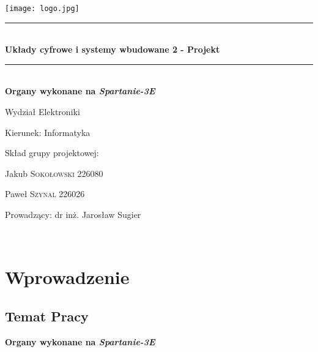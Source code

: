 \documentclass[11pt]{report}
\begin{document}
\begin{titlepage}
    \newcommand{\HRule}{\rule{\linewidth}{0.5mm}}
    \center
    \texttt{[image: logo.jpg]}\\[1cm] 
    \HRule \\[0.8cm]
    { \Large \bfseries Układy cyfrowe i systemy wbudowane 2 - Projekt}\\[0.4cm]
    \HRule \\[1.5cm]
    { \Large \bfseries Organy wykonane na \textit{Spartanie-3E}}\\[0.4cm]
    \textbf{ }
    \vspace{10mm} 
    
    \begin{minipage}{0.4\textwidth}
    \begin{flushleft} \large
    \end{flushleft}
    \end{minipage}
    \begin{minipage}{0.5\textwidth}
    \begin{flushright} \large
    \vfill
    \vspace{80mm} %
    \par Wydział Elektroniki
    \par Kierunek: Informatyka
    \vfill
    \vspace{10mm} %
    
    \par Skład grupy projektowej:\\
    \par Jakub \textsc{Sokołowski 226080}\\
    \par Paweł \textsc{Szynal 226026} \\
   \vspace{10mm} %
    \par Prowadzący: dr inż. Jarosław Sugier
    \end{flushright}
    \end{minipage}\\[3cm]
\end{titlepage}
\tableofcontents
\listoffigures
\lstlistoflistings
\newpage
\section{Wprowadzenie}
\subsection{Temat Pracy}
\centerline{\textbf{ Organy wykonane na \textit{Spartanie-3E}}}
\end{document}
